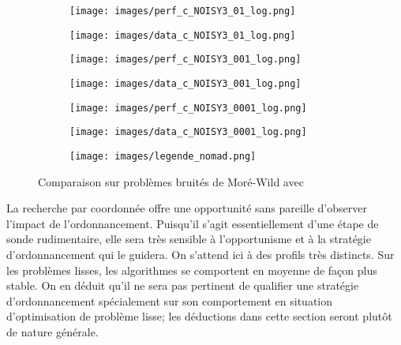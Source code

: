 	\begin{figure}[!htb] %
		\centering
		\begin{subfigure}{0.43\textwidth}
			\texttt{[image: images/perf\_c\_NOISY3\_01\_log.png]}
		\end{subfigure}%
		\begin{subfigure}{0.43\textwidth}
			\texttt{[image: images/data\_c\_NOISY3\_01\_log.png]}
		\end{subfigure}
		\smallskip
		\begin{subfigure}{0.43\textwidth}
			\texttt{[image: images/perf\_c\_NOISY3\_001\_log.png]}
		\end{subfigure}%
		\begin{subfigure}{0.43\textwidth}
			\texttt{[image: images/data\_c\_NOISY3\_001\_log.png]}
		\end{subfigure}
		\smallskip
		\begin{subfigure}{0.43\textwidth}
			\texttt{[image: images/perf\_c\_NOISY3\_0001\_log.png]}
		\end{subfigure}%
		\begin{subfigure}{0.43\textwidth}
			\texttt{[image: images/data\_c\_NOISY3\_0001\_log.png]}
		\end{subfigure}
		\smallskip
		\begin{subfigure}{0.95\textwidth}
			\texttt{[image: images/legende\_nomad.png]}
		\end{subfigure}
		\caption{Comparaison sur problèmes bruités de Moré-Wild avec \CS} \label{fig:3}
	\end{figure}
	\clearpage
	La recherche par coordonnée offre une opportunité sans pareille d'observer l'impact de l'ordonnancement. Puisqu'il s'agit essentiellement d'une étape de sonde rudimentaire, elle sera très sensible à l'opportunisme et à la stratégie d'ordonnancement qui le guidera. On s'attend ici à des profils très distincts. Sur les problèmes lisses, les algorithmes se comportent en moyenne de façon plus stable. On en déduit qu'il ne sera pas pertinent de qualifier une stratégie d'ordonnancement spécialement sur son comportement en situation d'optimisation de problème lisse; les déductions dans cette section seront plutôt de nature générale. \\\\
